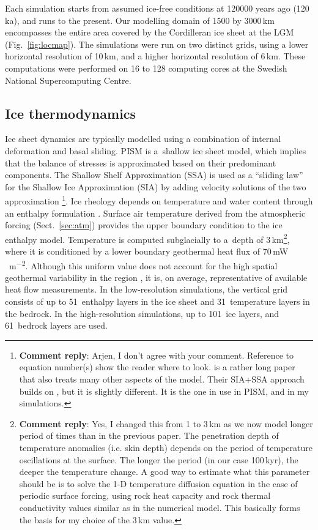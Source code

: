 \documentclass[tc, manuscript]{copernicus}
\newcommand{\renote}[1]{\footnote{\textbf{Comment reply}: #1}}
\begin{document}
Each simulation starts from assumed ice-free conditions at 120000 years ago
(120\,ka), and runs to the present. Our modelling domain of 1500 by 3000\,km
encompasses the entire area covered by the Cordilleran ice sheet at the LGM
(Fig.~\ref{fig:locmap}). The simulations were run on two distinct grids, using
a lower horizontal resolution of 10\,km, and a higher horizontal resolution of
6\,km. These computations were performed on 16 to 128 computing cores at the
Swedish National Supercomputing Centre.

\subsection{Ice thermodynamics}
\label{sec:icedyn}

Ice sheet dynamics are typically modelled using a combination of internal
deformation and basal sliding. PISM is a~shallow ice sheet model, which implies
that the balance of stresses is approximated based on their predominant
components. The Shallow Shelf Approximation (SSA) is used as a ``sliding law''
for the Shallow Ice Approximation (SIA) by adding velocity solutions of the
two approximation
\citep[Eqns.~7--9 and 15]{Bueler.Brown.2009, Winkelmann.etal.2011}\renote{
    Arjen, I don't agree with your comment. Reference to equation number(s)
    show the reader where to look. \citet{Winkelmann.etal.2011} is a rather
    long paper that also treats many other aspects of the model. Their SIA+SSA
    approach builds on \citep{Bueler.Brown.2009}, but it is slightly different.
    It is the one in use in PISM, and in my simulations.}.
Ice rheology depends on temperature and water content through an enthalpy
formulation \citep{Aschwanden.etal.2012}. Surface air temperature derived from
the atmospheric forcing (Sect.~\ref{sec:atm}) provides the upper boundary
condition to the ice enthalpy model. Temperature is computed subglacially to
a~depth of 3\,km\renote{
    Yes, I changed this from 1 to 3\,km as we now model longer period of times
    than in the previous paper. The penetration depth of temperature anomalies
    (i.e. skin depth) depends on the period of temperature oscillations at the
    surface. The longer the period (in our case 100\,kyr), the deeper the
    temperature change. A good way to estimate what this parameter should be is
    to solve the 1-D temperature diffusion equation in the case of periodic
    surface forcing, using rock heat capacity and rock thermal conductivity
    values similar as in the numerical model. This basically forms the basis
    for my choice of the 3\,km value.},
where it is conditioned by a lower boundary geothermal heat flux of
70\,\unit{mW\,m^{-2}}. Although this uniform value does not account for the
high spatial geothermal variability in the region
\citep{Blackwell.Richards.2004}, it is, on average, representative of available
heat flow measurements. In the low-resolution simulations, the vertical grid
consists of up to 51~enthalpy layers in the ice sheet and 31~temperature layers
in the bedrock. In the high-resolution simulations, up to 101~ice layers, and
61~bedrock layers are used.
\end{document}
